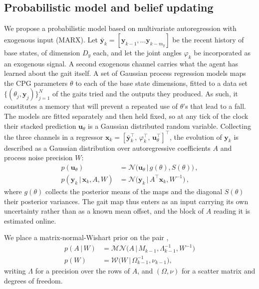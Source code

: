 \documentclass[letterpaper, 10 pt, conference]{ieeeconf}  %
\newcommand{\cN}{\mathcal{N}}
\newcommand{\given}[1][]{\,#1\vert\,}
\begin{document}
\subsection{Probabilistic model and belief updating}
We propose a probabilistic model based on multivariate autoregression with exogenous input (MARX). Let $\bar{\mathbf{y}}_k = [\mathbf{y}_{k-1}, \dots \mathbf{y}_{k-m_y}]$ be the recent history of base states, of dimension $D_y$ each, and let the joint angles $\varphi_k$ be incorporated as an exogenous signal.
A second exogenous channel carries what the agent has learned about the gait itself. A set of Gaussian process regression models maps the CPG parameters $\theta$ to each of the base state dimensions, fitted to a data set $\{(\theta_j, \mathbf{y}_j)\}_{j=1}^N$ of the gaits tried and the outputs they produced. As such, it constitutes a memory that will prevent a repeated use of $\theta$'s that lead to a fall. The models are fitted separately and then held fixed, so at any tick of the clock their stacked prediction $\mathbf{u}_{\theta}$ is a Gaussian distributed random variable. Collecting the three channels in a regressor $\mathbf{x}_k = [\bar{\mathbf{y}}_k^\top,\, \varphi_k^\top,\, \mathbf{u}_{\theta}^\top]^\top$, the evolution of $\mathbf{y}_k$ is described as a Gaussian distribution over autoregressive coefficients $A$ and process noise precision $W$:
\begin{align}
    p(\mathbf{u}_{\theta}) &= \cN\big(\mathbf{u}_{\theta} \given g(\theta), S(\theta)\big) \, , \label{eq:gp-input} \\
    p(\mathbf{y}_k \given \mathbf{x}_k, A, W) &= \cN\big(\mathbf{y}_k \given A^\top \mathbf{x}_k, W^{-1}\big) \, , \label{eq:marx}
\end{align}
where $g(\theta)$ collects the posterior means of the maps and the diagonal $S(\theta)$ their posterior variances.
The gait map thus enters as an input carrying its own uncertainty rather than as a known mean offset, and the block of $A$ reading it is estimated online.

We place a matrix-normal-Wishart prior on the pair \cite{nisslbeck2025factor},
\begin{align} \label{eq:mnw-prior}
    p(A \given W)  &=  \mathcal{MN}\big(A \given M_{k-1}, \Lambda_{k-1}^{-1}, W^{-1}\big) \\
   p(W) &= \mathcal{W}\big(W \given \Omega_{k-1}^{-1}, \nu_{k-1}\big) ,
\end{align}
writing $\Lambda$ for a precision over the rows of $A$, and $(\Omega, \nu)$ for a scatter matrix and degrees of freedom.
\end{document}
